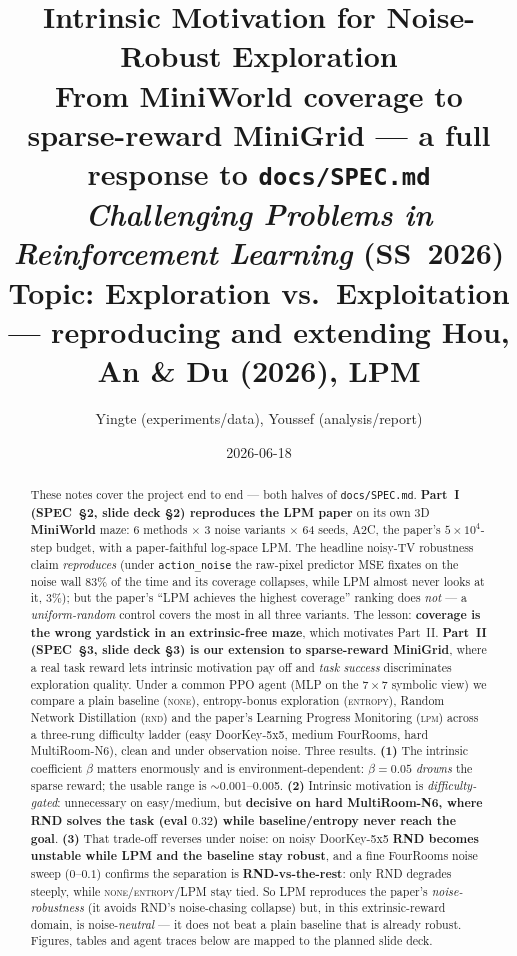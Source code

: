 \documentclass[11pt]{article}
\title{\textbf{Intrinsic Motivation for Noise-Robust Exploration}\\
\large From MiniWorld coverage to sparse-reward MiniGrid --- a full response to \texttt{docs/SPEC.md}\\
\normalsize \emph{Challenging Problems in Reinforcement Learning} (SS~2026)\\
\normalsize Topic: Exploration vs.\ Exploitation --- reproducing and extending Hou, An \& Du (2026), LPM}
\author{Yingte (experiments/data), Youssef (analysis/report)}
\date{2026-06-18}
\begin{document}
\maketitle

\begin{abstract}
\noindent These notes cover the project end to end --- both halves of \texttt{docs/SPEC.md}. \textbf{Part~I
(SPEC~\S2, slide deck \S2) reproduces the LPM paper} on its own 3D \textbf{MiniWorld} maze: 6 methods
$\times$ 3 noise variants $\times$ 64 seeds, A2C, the paper's $5\!\times\!10^4$-step budget, with a
paper-faithful log-space LPM. The headline noisy-TV robustness claim \emph{reproduces} (under
\texttt{action\_noise} the raw-pixel predictor MSE fixates on the noise wall $83\%$ of the time and its
coverage collapses, while LPM almost never looks at it, $3\%$); but the paper's ``LPM achieves the
highest coverage'' ranking does \emph{not} --- a \emph{uniform-random} control covers the most in all
three variants. The lesson: \textbf{coverage is the wrong yardstick in an extrinsic-free maze}, which
motivates Part~II. \textbf{Part~II (SPEC~\S3, slide deck \S3) is our extension to sparse-reward
MiniGrid}, where a real task reward lets intrinsic motivation pay off and \emph{task success}
discriminates exploration quality. Under a common PPO agent (MLP on the $7\times7$ symbolic view) we
compare a plain baseline (\textsc{none}), entropy-bonus exploration (\textsc{entropy}), Random Network
Distillation (\textsc{rnd}) and the paper's Learning Progress Monitoring (\textsc{lpm}) across a
three-rung difficulty ladder (easy DoorKey-5x5, medium FourRooms, hard MultiRoom-N6), clean and under
observation noise. Three results. \textbf{(1)} The intrinsic coefficient $\beta$ matters enormously and
is environment-dependent: $\beta{=}0.05$ \emph{drowns} the sparse reward; the usable range is
$\sim$0.001--0.005. \textbf{(2)} Intrinsic motivation is \emph{difficulty-gated}: unnecessary on
easy/medium, but \textbf{decisive on hard MultiRoom-N6, where RND solves the task (eval $0.32$) while
baseline/entropy never reach the goal}. \textbf{(3)} That trade-off reverses under noise: on noisy
DoorKey-5x5 \textbf{RND becomes unstable while LPM and the baseline stay robust}, and a fine FourRooms
noise sweep ($0$--$0.1$) confirms the separation is \textbf{RND-vs-the-rest}: only RND degrades steeply,
while \textsc{none}/\textsc{entropy}/LPM stay tied. So LPM reproduces the paper's \emph{noise-robustness}
(it avoids RND's noise-chasing collapse) but, in this extrinsic-reward domain, is noise-\emph{neutral}
--- it does not beat a plain baseline that is already robust. Figures, tables and agent
traces below are mapped to the planned slide deck.
\end{abstract}
\end{document}
